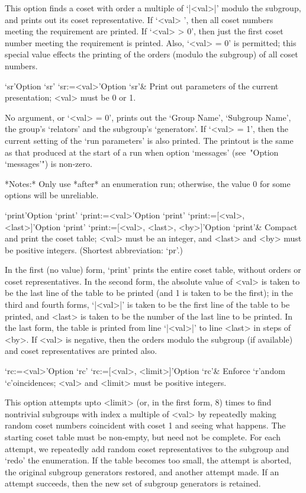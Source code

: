 This option finds a coset with order a multiple  of  `|<val>|'  modulo
the subgroup, and prints out its coset representative.  If  `<val>  ', then all coset numbers meeting the  requirement  are  printed.  If
`<val> > 0', then just the first coset number meeting the  requirement
is printed. Also, `<val> = 0' is permitted; this special value effects
the printing of the orders (modulo the subgroup) of all coset numbers.

\>`sr'{Option `sr'}
\>`sr:=<val>'{Option `sr'}&
Print out parameters of the current presentation; <val> must be  0  or
1.

No argument, or `<val> = 0', prints out the  `Group  Name',  `Subgroup
Name', the group's `relators'  and  the  subgroup's  `generators'.  If
`<val> = 1', then the current setting of the \lq{}run  parameters'  is
also printed. The printout is the same as that produced at  the  start
of a run when option `messages' (see~"Option `messages'") is non-zero.

*Notes:*
Only use *after* an enumeration run; otherwise, the value 0  for  some
options will be unreliable.

\>`print'{Option `print'}
\>`print:=<val>'{Option `print'}
\>`print:=[<val>, <last>]'{Option `print'}
\>`print:=[<val>, <last>, <by>]'{Option `print'}&
Compact and print the coset table;  <val>  must  be  an  integer,  and
<last> and <by> must be positive integers.
(Shortest abbreviation: `pr'.)

In the first (no value) form, `print' prints the entire  coset  table,
without orders or coset  representatives.  In  the  second  form,  the
absolute value of <val> is taken to be the last line of the  table  to
be printed (and 1 is taken to be the first); in the third  and  fourth
forms, `|<val>|' is taken to be the first line  of  the  table  to  be
printed, and <last> is taken to be the number of the last line  to  be
printed. In the last form, the table is printed from line `|<val>|' to
line <last> in steps of <by>. If <val> is negative,  then  the  orders
modulo the subgroup  (if  available)  and  coset  representatives  are
printed also.

\>`rc:=<val>'{Option `rc'}
\>`rc:=[<val>, <limit>]'{Option `rc'}&
Enforce `r'andom `c'oincidences; <val> and <limit>  must  be  positive
integers.

This option attempts upto <limit> (or, in the first form, 8) times  to
find nontrivial subgroups with index a multiple of <val> by repeatedly
making random coset numbers coincident with coset 1  and  seeing  what
happens. The starting coset table must be non-empty, but need  not  be
complete.  For  each  attempt,  we   repeatedly   add   random   coset
representatives to the subgroup and `redo'  the  enumeration.  If  the
table becomes too small, the attempt is aborted, the original subgroup
generators restored, and another attempt made. If an attempt succeeds,
then the new set of subgroup generators is retained.

